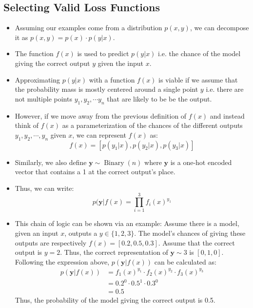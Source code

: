 \documentclass{article}
\newcommand{\mbf}[1]{\mathbf{#1}}
\begin{document}
\subsection{Selecting Valid Loss Functions}

\begin{itemize}
    \item Assuming our examples come from a distribution $p(x,y)$, we can decompose it as $p(x,y) = p(x) \cdot p(y | x)$.
    \item The function $f(x)$ is used to predict $p(y|x)$ i.e. the chance of the model giving the correct output $y$ given the input $x$.
    \item Approximating $p(y|x)$ with a function $f(x)$ is viable if we assume that the probability mass is mostly centered
    around a single point $y$ i.e. there are not multiple points $y_1, y_2, \cdots y_n$ that are likely to be be the output.
    \item However, if we move away from the previous definition of $f(x)$ and instead think of $f(x)$ as
    a parameterization of the chances of the different outputs $y_1, y_2, \cdots, y_n$ given $x$, we can represent $f(x)$ as:
    \[f(x) = [p(y_1 | x) , p(y_2 | x), p(y_3 | x)]\]
    \item Similarly, we also define $\mbf{y} \sim \operatorname{Binary}(n)$ where $\mbf{y}$ is a one-hot encoded vector that contains a 1 at the correct output's place.
    \item Thus, we can write: 
    \[p(\mbf{y} | f(x) = \prod^3_{i = 1}f_i(x)^{y_1}\]
    \item This chain of logic can be shown via an example:
    Assume there is a model, given an input $x$, outputs a $y \in \{1,2,3\}$. The model's chances of giving these outputs are respectively $f(x) = [0.2, 0.5, 0.3]$.
    Assume that the correct output is $y = 2$. Thus, the correct representation of $\mbf{y} \sim 3$ is $[0,1,0]$.
    Following the expression above, $p(\mbf{y} | f(x))$ can be calculated as:
    \begin{align*}
        p(\mbf{y} | f(x)) &= f_1(x)^{y_1} \cdot f_2(x)^{y_2} \cdot f_3(x)^{y_3} \\
        &= 0.2^0 \cdot 0.5^1 \cdot 0.3^0 \\
        &= 0.5 
    \end{align*}
    Thus, the probability of the model giving the correct output is 0.5.

\end{itemize}
\end{document}
